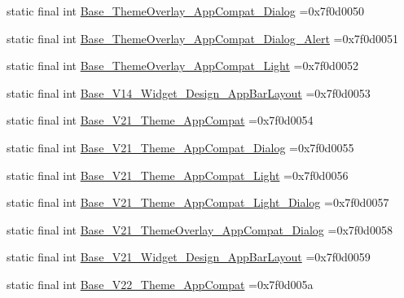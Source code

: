 \begin{DoxyCompactItemize}
\item 
static final int \mbox{\hyperlink{classcom_1_1example_1_1trainawearapplication_1_1_r_1_1style_a5e003968f047643278562c473c5eb0ce}{Base\+\_\+\+Theme\+Overlay\+\_\+\+App\+Compat\+\_\+\+Dialog}} =0x7f0d0050
\item 
static final int \mbox{\hyperlink{classcom_1_1example_1_1trainawearapplication_1_1_r_1_1style_aacd67e4aa744009fab1a86b2d3795fe4}{Base\+\_\+\+Theme\+Overlay\+\_\+\+App\+Compat\+\_\+\+Dialog\+\_\+\+Alert}} =0x7f0d0051
\item 
static final int \mbox{\hyperlink{classcom_1_1example_1_1trainawearapplication_1_1_r_1_1style_a3e45f16c6101b6aeff43a5e5798f7509}{Base\+\_\+\+Theme\+Overlay\+\_\+\+App\+Compat\+\_\+\+Light}} =0x7f0d0052
\item 
static final int \mbox{\hyperlink{classcom_1_1example_1_1trainawearapplication_1_1_r_1_1style_abba8f5c79577d2211bb6ce92d1bf23d0}{Base\+\_\+\+V14\+\_\+\+Widget\+\_\+\+Design\+\_\+\+App\+Bar\+Layout}} =0x7f0d0053
\item 
static final int \mbox{\hyperlink{classcom_1_1example_1_1trainawearapplication_1_1_r_1_1style_acca59082343824e76845c07144ddb56d}{Base\+\_\+\+V21\+\_\+\+Theme\+\_\+\+App\+Compat}} =0x7f0d0054
\item 
static final int \mbox{\hyperlink{classcom_1_1example_1_1trainawearapplication_1_1_r_1_1style_a134a0685b22342c740aa826be4867453}{Base\+\_\+\+V21\+\_\+\+Theme\+\_\+\+App\+Compat\+\_\+\+Dialog}} =0x7f0d0055
\item 
static final int \mbox{\hyperlink{classcom_1_1example_1_1trainawearapplication_1_1_r_1_1style_a8956de1b57df65f61aa7a53b88230161}{Base\+\_\+\+V21\+\_\+\+Theme\+\_\+\+App\+Compat\+\_\+\+Light}} =0x7f0d0056
\item 
static final int \mbox{\hyperlink{classcom_1_1example_1_1trainawearapplication_1_1_r_1_1style_a75a6673f9ee843e1c06af7c10fb16230}{Base\+\_\+\+V21\+\_\+\+Theme\+\_\+\+App\+Compat\+\_\+\+Light\+\_\+\+Dialog}} =0x7f0d0057
\item 
static final int \mbox{\hyperlink{classcom_1_1example_1_1trainawearapplication_1_1_r_1_1style_ad7c5847a8be15ee45106296c5d56527d}{Base\+\_\+\+V21\+\_\+\+Theme\+Overlay\+\_\+\+App\+Compat\+\_\+\+Dialog}} =0x7f0d0058
\item 
static final int \mbox{\hyperlink{classcom_1_1example_1_1trainawearapplication_1_1_r_1_1style_a182dec4f5ad5db6bea86ee216faa2b5a}{Base\+\_\+\+V21\+\_\+\+Widget\+\_\+\+Design\+\_\+\+App\+Bar\+Layout}} =0x7f0d0059
\item 
static final int \mbox{\hyperlink{classcom_1_1example_1_1trainawearapplication_1_1_r_1_1style_ac253e6a301764283ff6c9f0abd3db365}{Base\+\_\+\+V22\+\_\+\+Theme\+\_\+\+App\+Compat}} =0x7f0d005a

\end{DoxyCompactItemize}
